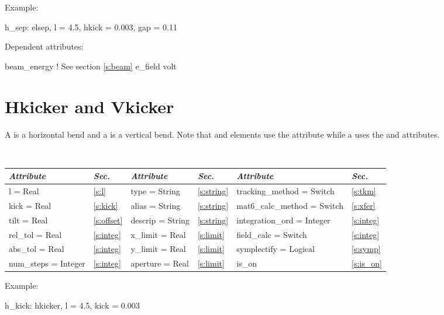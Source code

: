 \vskip0.05in \noindent
Example:
\begin{example}
  h_sep: elsep, l = 4.5, hkick = 0.003, gap = 0.11
\end{example}

\vskip0.05in \noindent
Dependent attributes:
\begin{example}
  beam\_energy  ! See section \ref{s:beam}
  e_field
  volt
\end{example}

\section{Hkicker and Vkicker}
\label{s:hvkicker}

A  is a horizontal bend and a  is a vertical
bend.  Note that  and  elements use the
 attribute while a  uses the  and  
attributes.

\toffset
\begin{center}
\tt
\begin{tabular}{|l|l||l|l||l|l|} \hline
  {\sl Attribute} & {\sl Sec.} & {\sl Attribute} & {\sl Sec.} &  {\sl Attribute} & {\sl Sec.} \\ \hline
  l        = Real       & \ref{s:l}       & type = String      & \ref{s:string} & tracking\_method = Switch    & \ref{s:tkm}   \\ \hline
  kick     = Real       & \ref{s:kick}    & alias = String     & \ref{s:string} & mat6\_calc\_method = Switch  & \ref{s:xfer}  \\ \hline
  tilt     = Real       & \ref{s:offset}  & descrip = String   & \ref{s:string} & integration\_ord = Integer   & \ref{s:integ} \\ \hline
  rel\_tol = Real       & \ref{s:integ}   & x\_limit = Real    & \ref{s:limit}  & field\_calc = Switch         & \ref{s:integ} \\ \hline 
  abs\_tol = Real       & \ref{s:integ}   & y\_limit = Real    & \ref{s:limit}  & symplectify = Logical        & \ref{s:symp}  \\ \hline
  num\_steps = Integer  & \ref{s:integ}   & aperture = Real    & \ref{s:limit}  & is\_on                       & \ref{s:is_on} \\ \hline
\end{tabular}
\end{center}
\toffset

\vskip0.05in \noindent
Example:
\begin{example}
  h_kick: hkicker, l = 4.5, kick = 0.003
\end{example}

